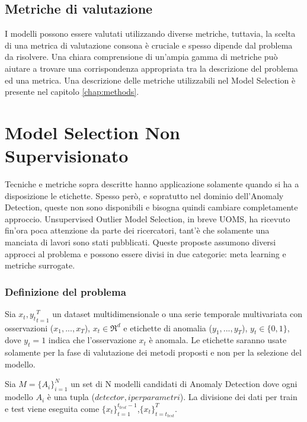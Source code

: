 \subsection{Metriche di valutazione}
I modelli possono essere valutati utilizzando diverse metriche, tuttavia, la scelta di una metrica di valutazione consona è cruciale e spesso dipende dal problema da risolvere. Una chiara comprensione di un'ampia gamma di metriche può aiutare a trovare una corrispondenza appropriata tra la descrizione del problema ed una metrica.
Una descrizione delle metriche utilizzabili nel Model Selection è presente nel capitolo \ref{chap:methods}.

\section{Model Selection Non Supervisionato}
Tecniche e metriche sopra descritte hanno applicazione solamente quando si ha a disposizione le etichette. Spesso però, e sopratutto nel dominio dell'Anomaly Detection, queste non sono disponibili e bisogna quindi cambiare completamente approccio. 
Unsupervised Outlier Model Selection, in breve UOMS, ha ricevuto fin'ora poca attenzione da parte dei ricercatori, tant'è che solamente una manciata di lavori sono stati pubblicati\cite{https://doi.org/10.48550/arxiv.2211.01834, https://doi.org/10.48550/arxiv.2210.01078, clei2022n,https://doi.org/10.48550/arxiv.1212.0960, https://doi.org/10.48550/arxiv.2009.10606}. Queste proposte assumono diversi approcci al problema e possono essere divisi in due categorie: meta learning e metriche surrogate.

\subsubsection{Definizione del problema}
Sia \({x_t,y_t}^T_{t=1}\) un dataset multidimensionale o una serie temporale multivariata con osservazioni (\(x_1,...,x_T\)), \(x_t\in\Re^d\) e etichette di anomalia (\(y_1,...,y_T\)), \(y_t \in \{0,1\}\), dove \(y_t=1\) indica che l'osservazione \(x_t\) è anomala. Le etichette saranno usate solamente per la fase di valutazione dei metodi proposti e non per la selezione del modello.

Sia \(M=\{A_i\}^N_{i=1}\) un set di N modelli candidati di Anomaly Detection dove ogni modello \(A_i\) è una tupla (\(detector, iperparametri\)).
La divisione dei dati per train e test viene eseguita come \(\{x_t\}_{t=1}^{t_{test}-1}\),\(\{x_t\}^{T}_{t=t_{test}}\).

